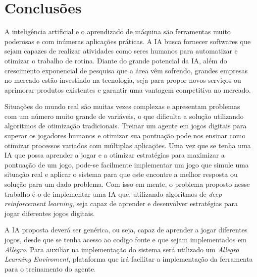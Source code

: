 \chapter{Conclusões}
\label{chap:conclusoes}

A inteligência artificial e o aprendizado de máquina são ferramentas muito poderosas e com inúmeras aplicações práticas. A IA busca fornecer softwares que sejam capazes de realizar atividades como seres humanos para automatizar e otimizar o trabalho de rotina. Diante do grande potencial da IA, além do crescimento exponencial de pesquisa que a área vêm sofrendo, grandes empresas no mercado estão investindo na tecnologia, seja para propor novos serviços ou aprimorar produtos existentes e garantir uma vantagem competitiva no mercado.


Situações do mundo real são muitas vezes complexas e apresentam problemas com um número muito grande de variáveis, o que dificulta a solução utilizando algoritmos de otimização tradicionais. Treinar um agente em jogos digitais para superar os jogadores humanos e otimizar sua pontuação pode nos ensinar como otimizar processos variados com múltiplas aplicações. Uma vez que se tenha uma IA que possa aprender a jogar e a otimizar estratégias para maximizar a pontuação de um jogo, pode-se facilmente implementar um jogo que simule uma situação real e aplicar o sistema para que este encontre a melhor resposta ou solução para um dado problema. Com isso em mente, o problema proposto nesse trabalho é o de implementar uma IA que, utilizando algoritmos de \textit{deep reinforcement learning}, seja capaz de aprender e desenvolver estratégias para jogar diferentes jogos digitais. 

A IA proposta deverá ser genérica, ou seja, capaz de aprender a jogar diferentes jogos, desde que se tenha acesso ao codigo fonte e que sejam implementados em \textit{Allegro}. Para auxiliar na implementação do sistema será utilizado um \textit{Allegro Learning Enviroment}, plataforma que irá facilitar a implementação da ferramenta para o treinamento do agente. 


